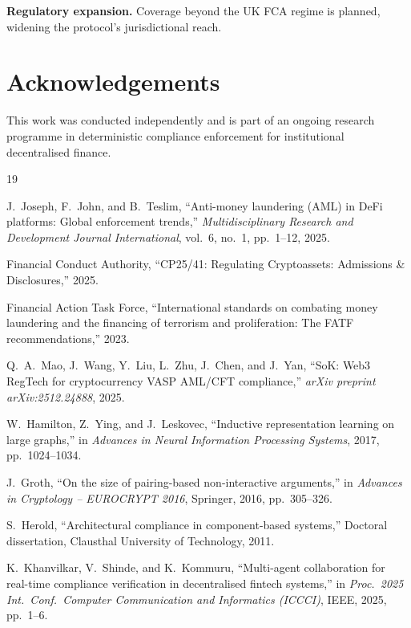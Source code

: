 \documentclass[journal]{IEEEtran}
\begin{document}
\textbf{Regulatory expansion.} Coverage beyond the UK FCA regime is planned, widening the protocol's jurisdictional reach.

\section*{Acknowledgements}
This work was conducted independently and is part of an ongoing research programme in deterministic compliance enforcement for institutional decentralised finance.

\begin{thebibliography}{19}

J.~Joseph, F.~John, and B.~Teslim, ``Anti-money laundering (AML) in DeFi platforms: Global enforcement trends,'' \textit{Multidisciplinary Research and Development Journal International}, vol.~6, no.~1, pp.~1--12, 2025.

Financial Conduct Authority, ``CP25/41: Regulating Cryptoassets: Admissions \& Disclosures,'' 2025.

Financial Action Task Force, ``International standards on combating money laundering and the financing of terrorism and proliferation: The FATF recommendations,'' 2023.

Q.~A.~Mao, J.~Wang, Y.~Liu, L.~Zhu, J.~Chen, and J.~Yan, ``SoK: Web3 RegTech for cryptocurrency VASP AML/CFT compliance,'' \textit{arXiv preprint arXiv:2512.24888}, 2025.

W.~Hamilton, Z.~Ying, and J.~Leskovec, ``Inductive representation learning on large graphs,'' in \textit{Advances in Neural Information Processing Systems}, 2017, pp.~1024--1034.

J.~Groth, ``On the size of pairing-based non-interactive arguments,'' in \textit{Advances in Cryptology -- EUROCRYPT 2016}, Springer, 2016, pp.~305--326.

S.~Herold, ``Architectural compliance in component-based systems,'' Doctoral dissertation, Clausthal University of Technology, 2011.

K.~Khanvilkar, V.~Shinde, and K.~Kommuru, ``Multi-agent collaboration for real-time compliance verification in decentralised fintech systems,'' in \textit{Proc.\ 2025 Int.\ Conf.\ Computer Communication and Informatics (ICCCI)}, IEEE, 2025, pp.~1--6.


\end{thebibliography}
\end{document}
